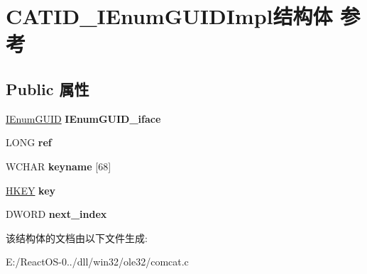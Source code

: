 \hypertarget{struct_c_a_t_i_d___i_enum_g_u_i_d_impl}{}\section{C\+A\+T\+I\+D\+\_\+\+I\+Enum\+G\+U\+I\+D\+Impl结构体 参考}
\label{struct_c_a_t_i_d___i_enum_g_u_i_d_impl}
\subsection*{Public 属性}
\begin{DoxyCompactItemize}
\item 
\mbox{\label{struct_c_a_t_i_d___i_enum_g_u_i_d_impl_a0f4011f8705fe358ee7b93e93a0c53bd}} 
\hyperlink{interface_i_enum_g_u_i_d}{I\+Enum\+G\+U\+ID} {\bfseries I\+Enum\+G\+U\+I\+D\+\_\+iface}
\item 
\mbox{\label{struct_c_a_t_i_d___i_enum_g_u_i_d_impl_abdc17679cc44d061ea7e1e9198c2db76}} 
L\+O\+NG {\bfseries ref}
\item 
\mbox{\label{struct_c_a_t_i_d___i_enum_g_u_i_d_impl_ad6597be5cccca58daff690064ea2e7de}} 
W\+C\+H\+AR {\bfseries keyname} \mbox{[}68\mbox{]}
\item 
\mbox{\label{struct_c_a_t_i_d___i_enum_g_u_i_d_impl_a05af155067a09e0a3084209da34c28f8}} 
\hyperlink{interfacevoid}{H\+K\+EY} {\bfseries key}
\item 
\mbox{\label{struct_c_a_t_i_d___i_enum_g_u_i_d_impl_a1a422939a2b66ab5b3c13311d05b00b8}} 
D\+W\+O\+RD {\bfseries next\+\_\+index}
\end{DoxyCompactItemize}


该结构体的文档由以下文件生成\+:\begin{DoxyCompactItemize}
\item 
E\+:/\+React\+O\+S-\/0../dll/win32/ole32/comcat.\+c\end{DoxyCompactItemize}
